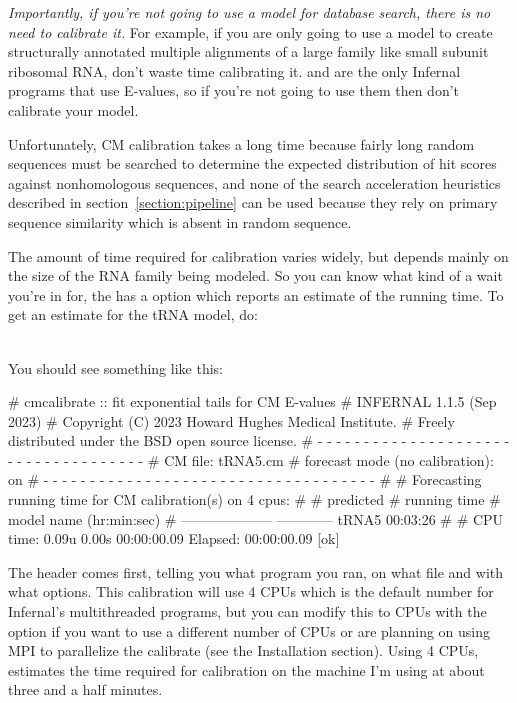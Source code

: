 \emph{Importantly, if you're not going to use a model for database
search, there is no need to calibrate it.} For example, if you are
only going to use a model to create structurally annotated multiple
alignments of a large family like small subunit ribosomal RNA, don't
waste time calibrating it.  and  are the
only Infernal programs that use E-values, so if you're not going to
use them then don't calibrate your model.

Unfortunately, CM calibration takes a long time because fairly long
random sequences must be searched to determine the expected
distribution of hit scores against nonhomologous sequences, and none
of the search acceleration heuristics described in
section~\ref{section:pipeline} can be used because they rely on
primary sequence similarity which is absent in random sequence.

The amount of time required for calibration varies widely, but
depends mainly on the size of the RNA family being modeled.
So you can know what kind of a wait you're in for, the
 has a  option which reports an
estimate of the running time. To get an estimate for the tRNA model, do:

\\

You should see something like this:

\begin{sreoutput}
# cmcalibrate :: fit exponential tails for CM E-values
# INFERNAL 1.1.5 (Sep 2023)
# Copyright (C) 2023 Howard Hughes Medical Institute.
# Freely distributed under the BSD open source license.
# - - - - - - - - - - - - - - - - - - - - - - - - - - - - - - - - - - - -
# CM file:                                     tRNA5.cm
# forecast mode (no calibration):              on
# - - - - - - - - - - - - - - - - - - - - - - - - - - - - - - - - - - - -
#
# Forecasting running time for CM calibration(s) on 4 cpus:
#
#                          predicted
#                       running time
# model name            (hr:min:sec)
# --------------------  ------------
  tRNA5                     00:03:26
#
# CPU time: 0.09u 0.00s 00:00:00.09 Elapsed: 00:00:00.09
[ok]
\end{sreoutput}

The header comes first, telling you what program you ran, on what file
and with what options. This calibration will use 4 CPUs which is the
default number for Infernal's multithreaded programs, but you can
modify this to  CPUs with the 
option if you want to use a different number of CPUs or are planning
on using MPI to parallelize the calibrate (see the Installation
section). Using 4 CPUs, 
estimates the time required for calibration on the machine I'm using
at about three and a half minutes.

